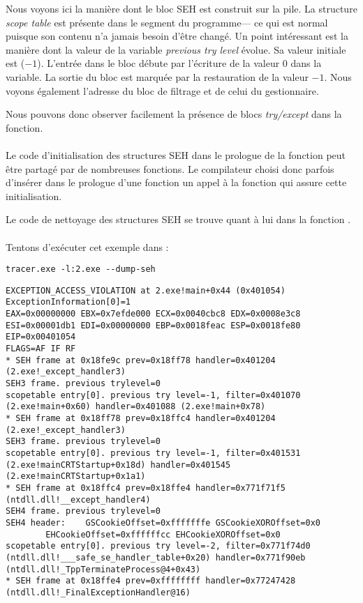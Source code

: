 

Nous voyons ici la manière dont le bloc SEH est construit sur la pile.
La structure \emph{scope table} est présente dans le segment  du programme--- ce qui est
normal puisque son contenu n'a jamais besoin d'être changé.
Un point intéressant est la manière dont la valeur de la variable \emph{previous try level} évolue.
Sa valeur initiale est  ($-1$).
L'entrée dans le bloc  débute par l'écriture de la valeur 0 dans la variable.
La sortie du bloc  est marquée par la restauration de la valeur $-1$.
Nous voyons également l'adresse du bloc de filtrage et de celui du gestionnaire.

Nous pouvons donc observer facilement la présence de blocs \emph{try/except} dans la fonction.\\
\\
Le code d'initialisation des structures SEH dans le prologue de la fonction peut être partagé par
de nombreuses fonctions. Le compilateur choisi donc parfois d'insérer dans le prologue d'une fonction
un appel à la fonction  qui assure cette initialisation.

Le code de nettoyage des structures SEH se trouve quant à lui dans la fonction .\\
\\
Tentons d'exécuter cet exemple dans \tracer{}:

\begin{lstlisting}
tracer.exe -l:2.exe --dump-seh
\end{lstlisting}

\begin{lstlisting}[caption=tracer.exe output]
EXCEPTION_ACCESS_VIOLATION at 2.exe!main+0x44 (0x401054) ExceptionInformation[0]=1
EAX=0x00000000 EBX=0x7efde000 ECX=0x0040cbc8 EDX=0x0008e3c8
ESI=0x00001db1 EDI=0x00000000 EBP=0x0018feac ESP=0x0018fe80
EIP=0x00401054
FLAGS=AF IF RF
* SEH frame at 0x18fe9c prev=0x18ff78 handler=0x401204 (2.exe!_except_handler3)
SEH3 frame. previous trylevel=0
scopetable entry[0]. previous try level=-1, filter=0x401070 (2.exe!main+0x60) handler=0x401088 (2.exe!main+0x78)
* SEH frame at 0x18ff78 prev=0x18ffc4 handler=0x401204 (2.exe!_except_handler3)
SEH3 frame. previous trylevel=0
scopetable entry[0]. previous try level=-1, filter=0x401531 (2.exe!mainCRTStartup+0x18d) handler=0x401545 (2.exe!mainCRTStartup+0x1a1)
* SEH frame at 0x18ffc4 prev=0x18ffe4 handler=0x771f71f5 (ntdll.dll!__except_handler4)
SEH4 frame. previous trylevel=0
SEH4 header:	GSCookieOffset=0xfffffffe GSCookieXOROffset=0x0
		EHCookieOffset=0xffffffcc EHCookieXOROffset=0x0
scopetable entry[0]. previous try level=-2, filter=0x771f74d0 (ntdll.dll!___safe_se_handler_table+0x20) handler=0x771f90eb (ntdll.dll!_TppTerminateProcess@4+0x43)
* SEH frame at 0x18ffe4 prev=0xffffffff handler=0x77247428 (ntdll.dll!_FinalExceptionHandler@16)
\end{lstlisting}

